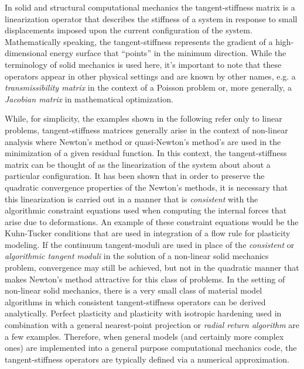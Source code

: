 \documentclass[preprint,12pt]{elsarticle}
\begin{document}
In solid and structural computational mechanics the tangent-stiffness matrix is a linearization operator that describes the stiffness of a system in response to small displacements imposed upon the current configuration of the system.  Mathematically speaking, the tangent-stiffness represents the gradient of a high-dimensional energy surface that ``points'' in the minimum direction. While the terminology of solid mechanics is used here, it's important to note that these operators appear in other physical settings and are known by other names, e.g. a \emph{transmissibility matrix} in the context of a Poisson problem or, more generally, a \emph{Jacobian matrix} in mathematical optimization.

While, for simplicity, the examples shown in the following refer only to linear problems, tangent-stiffness matrices generally arise in the context of non-linear analysis where Newton's method or quasi-Newton's method's are used in the minimization of a given residual function.  In this context, the tangent-stiffness matrix can be thought of as the linearization of the system about about a particular configuration.  It has been shown \cite{hughes1978consistent,hughes1978unconditionally} that in order to preserve the quadratic convergence properties of the Newton's methods, it is necessary that this linearization is carried out in a manner that is \emph{consistent} with the algorithmic constraint equations used when computing the internal forces that arise due to deformations.  An example of these constraint equations would be the Kuhn-Tucker conditions \cite{simo1998} that are used in integration of a flow rule for plasticity modeling.  If the continuum tangent-moduli are used in place of the \emph{consistent} or \emph{algorithmic tangent moduli} in the solution of a non-linear solid mechanics problem, convergence may still be achieved, but not in the quadratic manner that makes Newton's method attractive for this class of problems.  In the setting of non-linear solid mechanics, there is a very small class of material model algorithms in which consistent tangent-stiffness operators can be derived analytically.  Perfect plasticity and plasticity with isotropic hardening used in combination with a general nearest-point projection or \emph{radial return algorithm} are a few examples.  Therefore, when general models (and certainly more complex ones) are implemented into a general purpose computational mechanics code, the tangent-stiffness operators are typically defined via a numerical approximation.  
\end{document}
